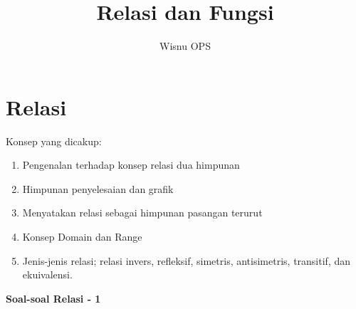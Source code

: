 \documentclass[fleqn, a4paper, 12pt]{article} %
\title{Relasi dan Fungsi}
\author{Wisnu OPS}
\begin{document}
\maketitle

\tableofcontents

\section{Relasi}

	Konsep yang dicakup:
	\begin{enumerate}
		\item Pengenalan terhadap konsep relasi dua himpunan
		\item Himpunan penyelesaian dan grafik
		\item Menyatakan relasi sebagai himpunan pasangan terurut
		\item Konsep Domain dan Range
		\item Jenis-jenis relasi; relasi invers, refleksif, simetris, antisimetris, transitif, dan ekuivalensi.
	\end{enumerate}
	
	\newpage
	
	\textbf{Soal-soal Relasi - 1}
	
\end{document}
